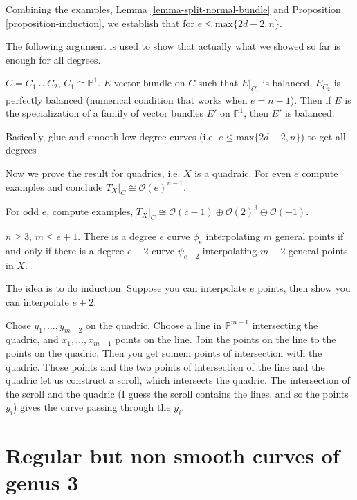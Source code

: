 \noindent
Combining the examples, Lemma
\ref{lemma-split-normal-bundle}
and Proposition \ref{proposition-induction},
we establish that for $e \leq
\text{max}\{2d-2,n\}$.

The following argument is used to show that
actually what we showed so far is enough for
all degrees.

\begin{lemma}
\label{lemma-smoothing-argument}
$C=C_1 \cup  C_2$, $C_1 \cong \mathbb{P}^1$.
$E$ vector bundle on $C$ such that
$E|_{C_1}$ is balanced,
$E_{C_2}$ is perfectly balanced
(numerical condition that works when
$e=n-1$).
Then if $E$ is the specialization of a family
of vector bundles $E'$ on $\mathbb{P}^1$,
then $E'$ is balanced.
\end{lemma}

\noindent
Basically, glue and smooth low degree curves
(i.e. $e \leq  \text{max}\{2d-2,n\}$)
to get all degrees


\medskip\noindent
Now we prove the result for quadrics,
i.e. $X$ is a quadraic.
For even $e$ compute examples and conclude
 $T_X|_C \cong \mathcal{O}(e)^{n-1}$.

For odd $e$, compute examples,
$T_X|_C\cong \mathcal{O}(c-1) \oplus
\mathcal{O}(2)^{3}\oplus \mathcal{O}(-1)$.

\begin{proposition}
\label{proposition-interpolation2}
$n\geq 3$, $m\leq  e+1$.
There is a degree $e$ curve $\phi_e$
interpolating
$m$ general points if and only if there is a
degree $e-2$ curve $\psi_{e-2}$ interpolating
$m-2$ general points in $X$.
\end{proposition}

\noindent
The idea is to do induction.
Suppose you can interpolate $e$ points,
then show you can interpolate $e+2$.

Chose $y_1,\ldots,y_{m-2}$ on the quadric.
Choose a line in $\mathbb{P}^{m-1}$
intersecting the quadric,
and $x_1,\ldots,x_{m-1}$ points on the line.
Join the points on the line to the points on
the quadric,
Then you get somem points of intersection
with the quadric.
Those points and the two points of
intersection of the line and the quadric
let us construct a scroll, which intersects
the quadric.
The intersection of the scroll and the
quadric
(I guess the scroll contains the lines, and
so the points $y_i$)
gives the curve passing through the $y_i$.

\section{Regular but non smooth curves of
genus 3}
\label{section-regular-but-non-smooth}

